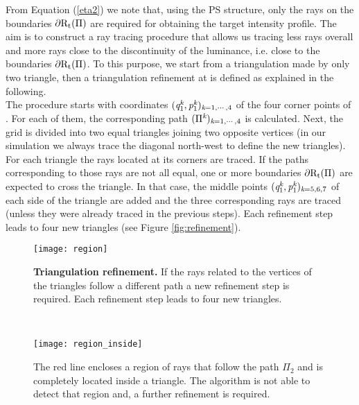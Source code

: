 From Equation (\ref{eta2}) we note that, using the PS structure, only the rays on the boundaries $\partial\mbox{$\textup{R}$}_\textrm{t}(\Pi)$ are required for obtaining the target intensity profile.
The aim is to construct a ray tracing procedure that allows us tracing less rays overall and more rays close to the discontinuity of the luminance, i.e. close to the boundaries $\partial\mbox{$\textup{R}$}_\textrm{t}(\Pi)$.
To this purpose, we start from a triangulation made by only two triangle, then a triangulation refinement at  is defined as explained in the following. \\ \indent
The procedure starts with coordinates $(\textit{q}_1^{\textit{k}},\textit{p}_1^{\textit{k}})_{\textit{k}=1, \cdots, 4}$ of the four corner points of . For each of them, the corresponding path $(\Pi^{\textit{k}})_{\textit{k}=1, \cdots, 4}$ is calculated. Next, the grid is divided into two equal triangles joining two opposite vertices (in our simulation we always trace the diagonal north-west to define the new triangles). For each triangle the rays located at its corners are traced. If the paths corresponding to
those rays are not all equal, one or more boundaries
$\partial\mbox{$\textup{R}$}_\textrm{t}(\Pi)$ are expected to cross the triangle.
In that case, the middle points $(\textit{q}_1^{\textit{k}},\textit{p}_1^{\textit{k}})_{\textit{k}=5,6,7}$ of each side of the triangle are added and
the three corresponding rays are traced (unless they were already traced in the previous steps). Each refinement step leads to four new triangles (see Figure \ref{fig:refinement}).
 \begin{figure}[h]
 \begin{minipage}[h]{\textwidth}
\centering
    \texttt{[image: region]}
  \caption{\textbf{Triangulation refinement.} If the rays related to the vertices of the triangles follow a different path a new refinement step is required.
   Each refinement step leads to four new triangles.}
  \label{fig:refinement}
\end{minipage}\\
\begin{minipage}[h]{\textwidth}
\centering
    \texttt{[image: region\_inside]}
  \caption{The red line encloses a region of rays that follow the path $\Pi_2$ and is completely located inside a triangle.
  The algorithm is not able to detect that region and, a further refinement is required.}
   \label{fig:region inside}
\end{minipage}
  \end{figure} \\ \indent
